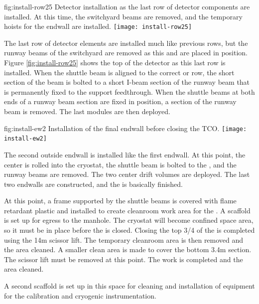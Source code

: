 \begin{dunefigure}{fig:install-row25}
  {Detector installation as the last row of detector components are installed. At this time, the switchyard beams are removed, and the temporary hoists for the endwall are installed.}
\texttt{[image: install-row25]}
\end{dunefigure}


The last row of detector elements are installed much like previous rows, but the runway beams of the  switchyard are removed as this  and  are placed in position. Figure \ref{fig:install-row25} shows the top of the detector as this last row is installed. When the shuttle beam is aligned to the correct  or  row, the short section of the beam is bolted to a short I-beam section of the runway beam that is permanently fixed to the  support feedthrough. When the shuttle beams at both ends of a runway beam section are fixed in position, a section of the runway beam is removed. The last  modules are then deployed. 


\begin{dunefigure}{fig:install-ew2}
  {Installation of the final endwall before closing the TCO.}
\texttt{[image: install-ew2]}
\end{dunefigure}

The second outside endwall is installed like the first endwall. At this point, the center  is rolled into the cryostat, the shuttle beam is bolted to the , and the runway beams are removed. The two center drift volumes  are deployed. The last two endwalls are constructed, and the  is basically finished. 

At this point, a frame supported by the shuttle beams is covered with flame retardant plastic and installed to create cleanroom work area for the .  A scaffold is set up for egress to the manhole. The cryostat will become confined space area, so it must be in place before the  is closed.  Closing the top 3/4 of the  is completed using the 14m scissor lift. The temporary cleanroom area is then removed and the area cleaned. A smaller clean area is made to cover the bottom 3.4m  section.  The scissor lift must be removed at this point. The  work is completed and the area cleaned.

A second scaffold is set up in this space  for cleaning and installation of equipment for the calibration and cryogenic instrumentation.

